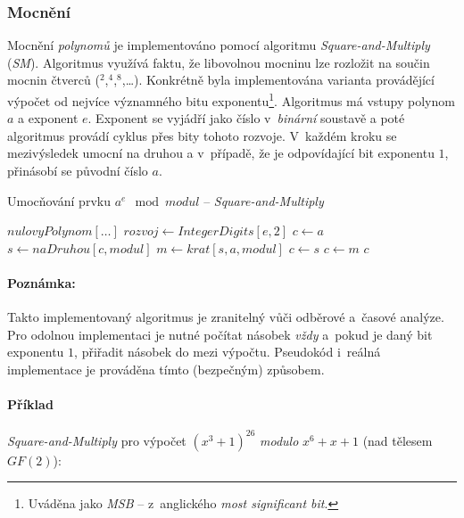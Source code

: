 \documentclass[thesis=M,czech,hidelinks]{FITthesis}[2012/06/26]
\newcommand{\0}{{\textcolor[gray]{0.80}{0}}}
\newenvironment{algoritmus}{
    \floatname{algorithm}{Algoritmus}
    \begin{algorithm}
}{\end{algorithm}}
\begin{document}
\subsubsection{Mocnění}

Mocnění \emph{polynomů} je implementováno pomocí algoritmu
\emph{Square-and-Multiply} (\emph{SM}). Algoritmus využívá faktu, že libovolnou
mocninu lze rozložit na součin mocnin čtverců ($^2$,$^4$,$^8$,\dots). Konkrétně
byla implementována varianta provádějící výpočet od nejvíce významného bitu
exponentu\footnote{
    Uváděna jako \emph{MSB} -- z~anglického \emph{most significant bit}.
}. Algoritmus má vstupy polynom $a$ a exponent $e$. Exponent se vyjádří jako
číslo v~\emph{binární} soustavě a poté algoritmus provádí cyklus přes bity
tohoto rozvoje. V~každém kroku se mezivýsledek umocní na druhou a v~případě, že
je odpovídající bit exponentu $1$, přinásobí se původní číslo $a$.


\begin{algoritmus}[!ht]
    \caption{Umocňování prvku $a^e \mod modul$ -- \emph{Square-and-Multiply}}
    \begin{algorithmic}[1]
            \State \Return $nulovyPolynom[\ldots]$
        \EndIf
        \State $ rozvoj \gets IntegerDigits[ e, 2 ] $
        \State $ c \gets a $
            \State $ s \gets naDruhou[ c, modul ] $
            \State $ m \gets krat[ s, a, modul ] $
                \State $ c \gets s $
            \Else
                \State $ c \gets m $
            \EndIf
        \EndFor
        \State \Return $c$
     \EndFunction
    \end{algorithmic}
\end{algoritmus}


\paragraph{Poznámka:} Takto implementovaný algoritmus je zranitelný vůči
odběrové a~časové analýze.  Pro odolnou implementaci je nutné počítat násobek
\emph{vždy} a~pokud je daný bit exponentu $1$, přiřadit násobek do mezi výpočtu.
Pseudokód i~reálná implementace je prováděna tímto (bezpečným) způsobem.

\paragraph{Příklad} \emph{Square-and-Multiply} pro výpočet
$\left(x^3+1\right)^{26}$ \emph{modulo} $x^6+x+1$ (nad tělesem $GF(2)$):
\end{document}
